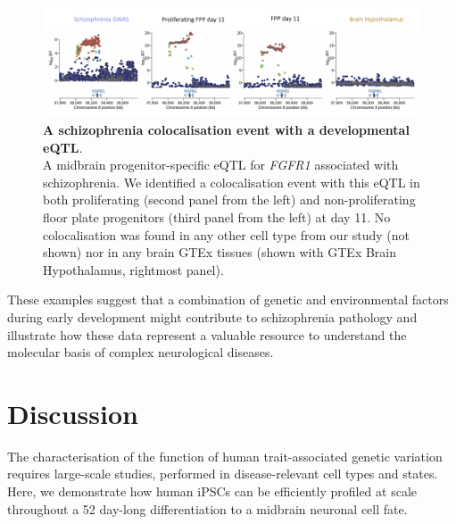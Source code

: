 \begin{figure}[h]
\centering
\includegraphics[width=15.5cm]{Chapter5/Fig/neuroseq_coloc_example2_FGFR1.png}
\caption[Second example of colocalisation]{\textbf{A schizophrenia colocalisation event with a developmental eQTL}.\\
A midbrain progenitor-specific eQTL for \textit{FGFR1} associated with schizophrenia. 
We identified a colocalisation event with this eQTL in both proliferating (second panel from the left) and non-proliferating floor plate progenitors (third panel from the left) at day 11. 
No colocalisation was found in any other cell type from our study (not shown) nor in any brain GTEx tissues (shown with GTEx Brain Hypothalamus, rightmost panel).}
\label{fig:neuroseq_coloc_example2}
\end{figure}

\newpage

These examples suggest that a combination of genetic and environmental factors during early development might contribute to schizophrenia pathology and illustrate how these data represent a valuable resource to understand the molecular basis of complex neurological diseases.



\section{Discussion}
\label{sec:neuroseq_discussion}





The characterisation of the function of human trait-associated genetic variation requires large-scale studies, performed in disease-relevant cell types and states. 
Here, we demonstrate how human iPSCs can be efficiently profiled at scale throughout a 52 day-long differentiation to a midbrain neuronal cell fate. \\

